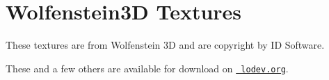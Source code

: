 \chapter{Wolfenstein3D Textures}
\hypertarget{md_textures_2wolfenstein_2README}{}\label{md_textures_2wolfenstein_2README}
\label{md_textures_2wolfenstein_2README_autotoc_md1}%
%
 These textures are from Wolfenstein 3D and are copyright by ID Software.

These and a few others are available for download on \href{https://lodev.org/cgtutor/raycasting.html\#Wolfenstein_3D_Textures_}{\texttt{ lodev.\+org}}. 